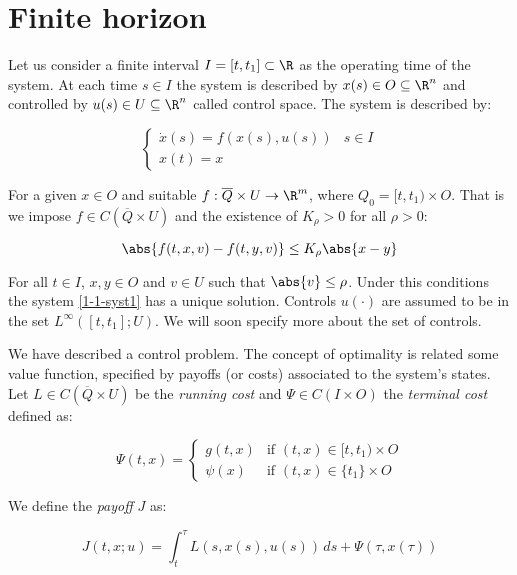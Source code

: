 \section{Finite horizon}


Let us consider a finite interval $I=[t,t_1]\subset\R$ as the operating time of the system. At each time $s\in I$ the system is described by $x(s)\in O\subseteq \R^n$ and controlled by $u(s)\in U\subseteq\R^n$
called control space. The system is described by:

\begin{equation}\label{1-1-syst1}
    \begin{cases}
        \dot{x}(s) = f(x(s),u(s)) & s\in I \\
        x(t) = x
    \end{cases}
\end{equation}

For a given $x\in O$ and suitable $f:\overline{Q}\times U \rightarrow \R^m$, where $Q_0=[t,t_1)\times O$. That is we impose $f\in C(\overline{Q}\times U)$ and the existence of $K_{\rho}>0$ for all $\rho>0$:

\begin{equation}\label{1-1-lipsch}
    \abs{f(t,x,v)-f(t,y,v)} \leq K_{\rho}\abs{x-y}
\end{equation}

For all $t\in I$, $x,y\in O$ and $v\in U$ such that $\abs{v}\leq\rho$. Under this conditions the system \ref*{1-1-syst1} has a unique solution. 
Controls $u(\cdot)$ are assumed to be in the set $L^{\infty}\left([t,t_1];U\right)$. We will soon specify more about the set of controls.

We have described a control problem. The concept of optimality is related some value function, specified by payoffs (or costs) associated to the system's states.
Let $L\in C(\overline{Q}\times U)$ be the \textit{running cost} and $\Psi\in C(I\times O)$ the \textit{terminal cost} defined as:

\begin{equation}\label{1-1-deftermcost}
    \Psi(t,x) = \begin{cases}
        g(t,x) & \text{if } (t,x)\in [t,t_1)\times O \\
        \psi(x) & \text{if } (t,x)\in \{t_1\}\times O  
    \end{cases}
\end{equation}

We define the \textit{payoff} $J$ as:

\begin{equation}\label{1-1-payoff1}
    J(t,x;u) = \int_t^{\tau}L(s,x(s),u(s)) \,ds + \Psi(\tau, x(\tau))
\end{equation}

